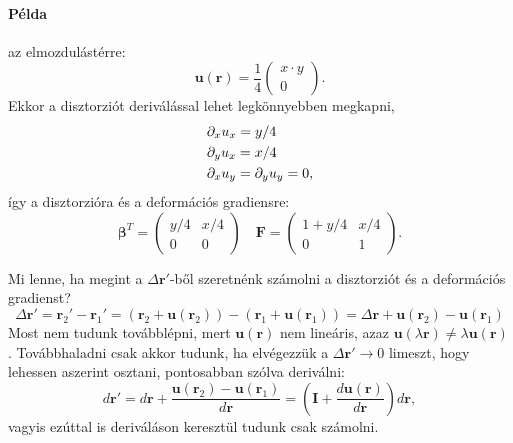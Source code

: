 \documentclass[12pt,a4paper]{scrartcl}
\let\mathbf\bm
\begin{document}
\paragraph{Példa} az elmozdulástérre:
\[{\mathbf{u}}\left( {\mathbf{r}} \right) = \frac{1}{4}\left( {\begin{array}{*{20}{c}}
  {x \cdot y} \\ 
  0 
\end{array}} \right).\]
Ekkor a disztorziót deriválással lehet legkönnyebben megkapni,
\[\begin{gathered}
  {\partial _x}{u_x} = y/4 \hfill \\
  {\partial _y}{u_x} = x/4 \hfill \\
  {\partial _x}{u_y} = {\partial _y}{u_y} = 0, \hfill \\ 
\end{gathered} \]
így a disztorzióra és a deformációs gradiensre:
\[{{\mathbf{\beta }}^T} = \left( {\begin{array}{*{20}{c}}
  {y/4}&{x/4} \\ 
  0&0 
\end{array}} \right)\quad {\mathbf{F}} = \left( {\begin{array}{*{20}{c}}
  {1 + y/4}&{x/4} \\ 
  0&1 
\end{array}} \right).\]

Mi lenne, ha megint a $\Delta {\mathbf{r}}'$-ből szeretnénk számolni a disztorziót és a deformációs gradienst?
\[\Delta {\mathbf{r}}' = {{\mathbf{r}}_2}' - {{\mathbf{r}}_1}' = \left( {{{\mathbf{r}}_2} + {\mathbf{u}}\left( {{{\mathbf{r}}_2}} \right)} \right) - \left( {{{\mathbf{r}}_1} + {\mathbf{u}}\left( {{{\mathbf{r}}_1}} \right)} \right) = \Delta {\mathbf{r}} + {\mathbf{u}}\left( {{{\mathbf{r}}_2}} \right) - {\mathbf{u}}\left( {{{\mathbf{r}}_1}} \right)\]
Most nem tudunk továbblépni, mert ${\mathbf{u}}\left( {\mathbf{r}} \right)$ nem lineáris, azaz ${\mathbf{u}}\left( {\lambda {\mathbf{r}}} \right) \ne \lambda {\mathbf{u}}\left( {\mathbf{r}} \right)$. Továbbhaladni csak akkor tudunk, ha elvégezzük a $\Delta {\mathbf{r}}' \to 0$ limeszt, hogy lehessen aszerint osztani, pontosabban szólva deriválni:
\[d{\mathbf{r}}' = d{\mathbf{r}} + \frac{{{\mathbf{u}}\left( {{{\mathbf{r}}_2}} \right) - {\mathbf{u}}\left( {{{\mathbf{r}}_1}} \right)}}{{d{\mathbf{r}}}} = \left( {{\mathbf{I}} + \frac{{d{\mathbf{u}}\left( {\mathbf{r}} \right)}}{{d{\mathbf{r}}}}} \right)d{\mathbf{r}},\]
vagyis ezúttal is deriváláson keresztül tudunk csak számolni.
\end{document}
